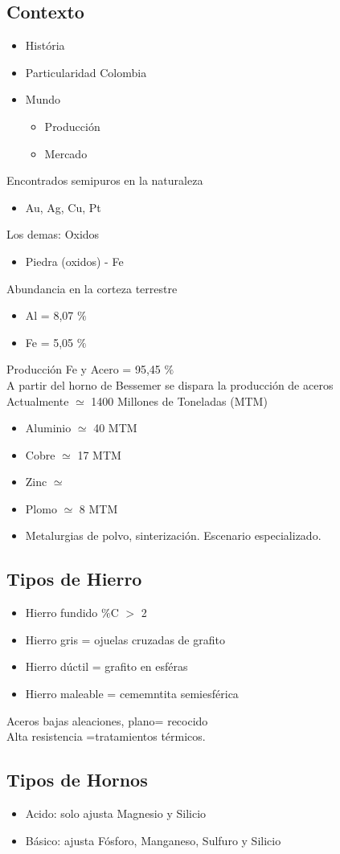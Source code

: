 \documentclass {article}
\begin{document}
\subsection*{Contexto}
\begin{itemize}
 \item História
 \item Particularidad Colombia
 \item Mundo
\begin{itemize}
 \item Producción
 \item Mercado
\end{itemize}
\end{itemize}
Encontrados semipuros en la naturaleza
\begin{itemize}
 \item Au, Ag, Cu, Pt
\end{itemize}
Los demas: Oxidos
\begin{itemize}
 \item Piedra (oxidos) - Fe
\end{itemize}
Abundancia en la corteza terrestre
\begin{itemize}
 \item Al = 8,07 $\%$
 \item Fe = 5,05 $\%$
\end{itemize}
Producción Fe y Acero = 95,45 $\%$\\
A partir del horno de Bessemer se dispara la producción de aceros\\
Actualmente $\simeq$ 1400 Millones de Toneladas (MTM)
\begin{itemize}
 \item Aluminio $\simeq$ 40 MTM
 \item Cobre $\simeq$ 17 MTM
 \item Zinc $\simeq$
 \item Plomo $\simeq$ 8 MTM
 \item Metalurgias de polvo, sinterización. Escenario especializado.
\end{itemize}
\subsection*{Tipos de Hierro}
\begin{itemize}
 \item Hierro fundido $\%$C $>$ 2
 \item Hierro gris = ojuelas cruzadas de grafito
 \item Hierro dúctil = grafito en esféras
 \item Hierro maleable = cememntita semiesférica
\end{itemize}
Aceros bajas aleaciones, plano= recocido\\
Alta resistencia =tratamientos térmicos.
\subsection*{Tipos de Hornos}
\begin{itemize}
 \item Acido: solo ajusta Magnesio y Silicio
 \item Básico: ajusta Fósforo, Manganeso, Sulfuro y Silicio
\end{itemize}
\end{document}
